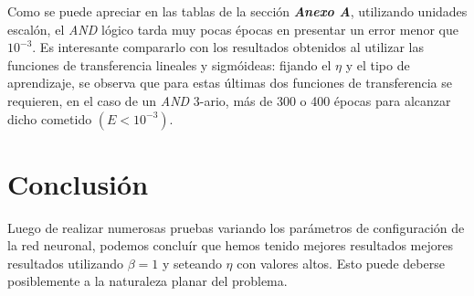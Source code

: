 \documentclass[%
    final,
    reprint,
    notitlepage,
    narroweqnarray,
    inline,
    twoside,
    invited
    ]{ieee}
\begin{document}
\par Como se puede apreciar en las tablas de la sección \textit{\textbf{Anexo A}}, utilizando unidades escalón, el \textit{AND} lógico tarda muy pocas épocas en presentar un error menor que $10^{-3}$. Es interesante compararlo con los resultados obtenidos al utilizar las funciones de transferencia lineales y sigmóideas: fijando el $\eta$ y el tipo de aprendizaje, se observa que para estas últimas dos funciones de transferencia se requieren, en el caso de un \textit{AND} 3-ario, más de 300 o 400 épocas para alcanzar dicho cometido $(E < 10^{-3} )$.



\section{Conclusión}

\PARstart Luego de realizar numerosas pruebas variando los parámetros de configuración de la red neuronal, podemos concluír que hemos tenido mejores resultados mejores resultados utilizando $\beta=1$ y seteando $\eta$ con valores altos. Esto puede deberse posiblemente a la naturaleza planar del problema.

%
%
%
%
%



\end{document}
